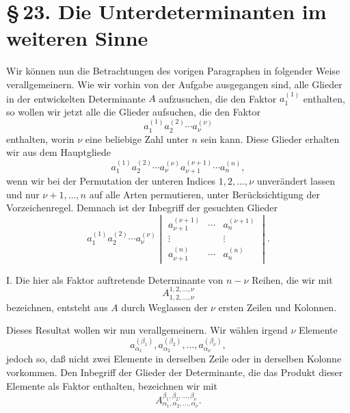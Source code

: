 \documentclass[11pt]{article}
\begin{document}
\section*{\S\,23. Die Unterdeterminanten im weiteren Sinne}

Wir können nun die Betrachtungen des vorigen Paragraphen in folgender Weise verallgemeinern.  Wie wir vorhin von der Aufgabe ausgegangen sind, alle Glieder in der entwickelten Determinante \(A\) aufzusuchen, die den Faktor \(a_1^{(1)}\) enthalten, so wollen wir jetzt alle die Glieder aufsuchen, die den Faktor
\[
        a_1^{(1)}a_2^{(2)}\cdots a_\nu^{(\nu)}
\]
enthalten, worin \(\nu\) eine beliebige Zahl unter \(n\) sein kann.  Diese Glieder erhalten wir aus dem Hauptgliede
\[
        a_1^{(1)}a_2^{(2)}\cdots a_\nu^{(\nu)}a_{\nu+1}^{(\nu+1)}\cdots a_n^{(n)},
\]
wenn wir bei der Permutation der unteren Indices \(1,2,\ldots,\nu\) unverändert lassen und nur \(\nu+1,\ldots,n\) auf alle Arten permutieren, unter Berücksichtigung der Vorzeichenregel.  Demnach ist der Inbegriff der gesuchten Glieder
\begin{equation}
        a_1^{(1)}a_2^{(2)}\cdots a_\nu^{(\nu)}
        \begin{vmatrix}
        a_{\nu+1}^{(\nu+1)}&\cdots&a_n^{(\nu+1)}\\
        \vdots&&\vdots\\
        a_{\nu+1}^{(n)}&\cdots&a_n^{(n)}
        \end{vmatrix}.
\tag{1}
\end{equation}

I. Die hier als Faktor auftretende Determinante von \(n-\nu\) Reihen, die wir mit
\[
        A_{1,2,\ldots,\nu}^{1,2,\ldots,\nu}
\]
bezeichnen, entsteht aus \(A\) durch Weglassen der \(\nu\) ersten Zeilen und Kolonnen.

Dieses Resultat wollen wir nun verallgemeinern.  Wir wählen irgend \(\nu\) Elemente
\begin{equation}
        a_{\alpha_1}^{(\beta_1)},
        a_{\alpha_2}^{(\beta_2)},\ldots,
        a_{\alpha_\nu}^{(\beta_\nu)},
\tag{3}
\end{equation}
jedoch so, daß nicht zwei Elemente in derselben Zeile oder in derselben Kolonne vorkommen.  Den Inbegriff der Glieder der Determinante, die das Produkt dieser Elemente als Faktor enthalten, bezeichnen wir mit
\begin{equation}
        A_{\alpha_1,\alpha_2,\ldots,\alpha_\nu}^{\beta_1,\beta_2,\ldots,\beta_\nu}.
\tag{2}
\end{equation}
\end{document}
